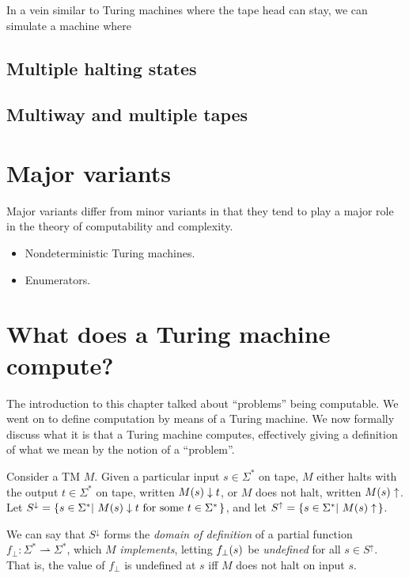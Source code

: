 In a vein similar to Turing machines where the tape head can stay, we can
simulate a machine where

\subsection{Multiple halting states}

\subsection{Multiway and multiple tapes}

\section{Major variants}

Major variants differ from minor variants in that they tend to play a major
role in the theory of computability and complexity.

\begin{itemize}

\item Nondeterministic Turing machines.

\item Enumerators.

\end{itemize}

\section{What does a Turing machine compute?}\label{sec:background-what-tm-computes}

The introduction to this chapter talked about ``problems'' being computable. We
went on to define computation by means of a Turing machine. We now formally
discuss what it is that a Turing machine computes, effectively giving a
definition of what we mean by the notion of a ``problem''.

Consider a TM $M$. Given a particular input $s\in\Sigma^*$ on tape, $M$ either
halts with the output $t\in\Sigma^*$ on tape, written $M\mathopen{}\left({s}\right)\mathclose{}\downarrow t$, or
$M$ does not halt, written $M\mathopen{}\left({s}\right)\mathclose{}\uparrow$. Let
$S^\downarrow=\mathopen{}\left\{{s\in\Sigma^* \mathopen{}\left|\ {\text{$M\mathopen{}\left({s}\right)\mathclose{}\downarrow t$ for some
$t\in\Sigma^*$}}\right.\mathclose{} }\right\}\mathclose{}$, and let
$S^\uparrow=\mathopen{}\left\{{s\in\Sigma^*\mathopen{}\left|\ {M\mathopen{}\left({s}\right)\mathclose{}\uparrow}\right.\mathclose{}}\right\}\mathclose{}$.

We can say that $S^\downarrow$ forms the \emph{domain of definition} of a
partial function $f_\bot : \Sigma^* \rightharpoonup \Sigma^*$, which $M$
\emph{implements}, letting $f_\bot\mathopen{}\left({s}\right)\mathclose{}$ be \emph{undefined} for all $s\in
S^\uparrow$.  That is, the value of $f_\bot$ is undefined at $s$ iff $M$ does
not halt on input $s$.


